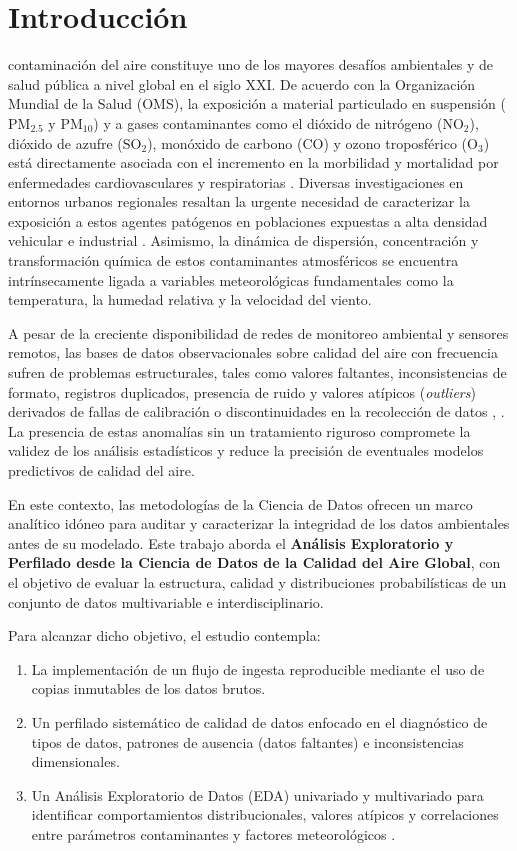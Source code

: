 \documentclass[journal,twocolumn,spanish]{IEEEtran}
\begin{document}
\section{Introducción}
 contaminación del aire constituye uno de los mayores desafíos ambientales y de salud pública a nivel global en el siglo XXI. De acuerdo con la Organización Mundial de la Salud (OMS), la exposición a material particulado en suspensión ($\text{PM}_{2.5}$ y $\text{PM}_{10}$) y a gases contaminantes como el dióxido de nitrógeno ($\text{NO}_2$), dióxido de azufre ($\text{SO}_2$), monóxido de carbono ($\text{CO}$) y ozono troposférico ($\text{O}_3$) está directamente asociada con el incremento en la morbilidad y mortalidad por enfermedades cardiovasculares y respiratorias \cite{OMS2021}. Diversas investigaciones en entornos urbanos regionales resaltan la urgente necesidad de caracterizar la exposición a estos agentes patógenos en poblaciones expuestas a alta densidad vehicular e industrial \cite{Rivas2022}. Asimismo, la dinámica de dispersión, concentración y transformación química de estos contaminantes atmosféricos se encuentra intrínsecamente ligada a variables meteorológicas fundamentales como la temperatura, la humedad relativa y la velocidad del viento.

A pesar de la creciente disponibilidad de redes de monitoreo ambiental y sensores remotos, las bases de datos observacionales sobre calidad del aire con frecuencia sufren de problemas estructurales, tales como valores faltantes, inconsistencias de formato, registros duplicados, presencia de ruido y valores atípicos (\emph{outliers}) derivados de fallas de calibración o discontinuidades en la recolección de datos \cite{Wickham2014}, \cite{Little2019}. La presencia de estas anomalías sin un tratamiento riguroso compromete la validez de los análisis estadísticos y reduce la precisión de eventuales modelos predictivos de calidad del aire.

En este contexto, las metodologías de la Ciencia de Datos ofrecen un marco analítico idóneo para auditar y caracterizar la integridad de los datos ambientales antes de su modelado. Este trabajo aborda el \textbf{Análisis Exploratorio y Perfilado desde la Ciencia de Datos de la Calidad del Aire Global}, con el objetivo de evaluar la estructura, calidad y distribuciones probabilísticas de un conjunto de datos multivariable e interdisciplinario.

Para alcanzar dicho objetivo, el estudio contempla:
\begin{enumerate}
    \item La implementación de un flujo de ingesta reproducible mediante el uso de copias inmutables de los datos brutos.
    \item Un perfilado sistemático de calidad de datos enfocado en el diagnóstico de tipos de datos, patrones de ausencia (datos faltantes) e inconsistencias dimensionales.
    \item Un Análisis Exploratorio de Datos (EDA) univariado y multivariado para identificar comportamientos distribucionales, valores atípicos y correlaciones entre parámetros contaminantes y factores meteorológicos \cite{Tukey1977}.
\end{enumerate}
\end{document}
